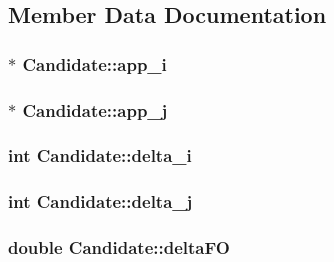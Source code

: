 \subsection{Member Data Documentation}
\hypertarget{classCandidate_a1bfed0429bba41f57dce0fbd37225c2c}{
\subsubsection[{app\-\_\-i}]{$\ast$ Candidate\-::app\-\_\-i}}\label{classCandidate_a1bfed0429bba41f57dce0fbd37225c2c}
\hypertarget{classCandidate_a8b0f26e8b45e9a3331be8a9694d3be5e}{
\subsubsection[{app\-\_\-j}]{$\ast$ Candidate\-::app\-\_\-j}}\label{classCandidate_a8b0f26e8b45e9a3331be8a9694d3be5e}
\hypertarget{classCandidate_ab1033e1f3e0060f0773c7d9268c2ce0b}{
\subsubsection[{delta\-\_\-i}]{\setlength{\rightskip}{0pt plus 5cm}int Candidate\-::delta\-\_\-i}}\label{classCandidate_ab1033e1f3e0060f0773c7d9268c2ce0b}
\hypertarget{classCandidate_a02528143e2448bfcad797aae2fe1ac90}{
\subsubsection[{delta\-\_\-j}]{\setlength{\rightskip}{0pt plus 5cm}int Candidate\-::delta\-\_\-j}}\label{classCandidate_a02528143e2448bfcad797aae2fe1ac90}
\hypertarget{classCandidate_a1bfc07aae3b3914bba57e057936399e7}{
\subsubsection[{delta\-F\-O}]{\setlength{\rightskip}{0pt plus 5cm}double Candidate\-::delta\-F\-O}}\label{classCandidate_a1bfc07aae3b3914bba57e057936399e7}
